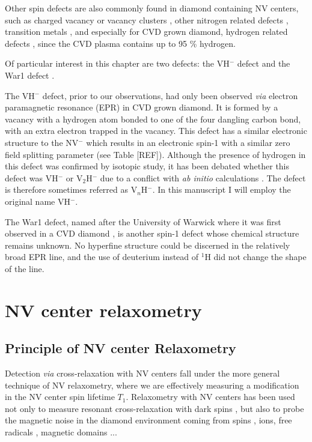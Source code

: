 \documentclass[a4paper]{report}
\begin{document}
Other spin defects are also commonly found in diamond containing NV centers, such as charged vacancy or vacancy clusters \citep{hounsome2006origin}, other nitrogen related defects \citep{newton2007epr}, transition metals \citep{isoya1990fourier}, and especially for CVD grown diamond, hydrogen related defects \citep{hartland2014study}, since the CVD plasma contains up to 95 \% hydrogen.

Of particular interest in this chapter are two defects: the VH$^-$ defect \citep{glover2003hydrogen, glover2004hydrogen} and the War1 defect \citep{cruddace2007magnetic}. 

The VH$^-$ defect, prior to our observations, had only been observed \textit{via} electron paramagnetic resonance (EPR) in CVD grown diamond. It is formed by a vacancy with a hydrogen atom bonded to one of the four dangling carbon bond, with an extra electron trapped in the vacancy. This defect has a similar electronic structure to the NV$^-$ which results in an electronic spin-1 with a similar zero field splitting parameter (see Table [REF]). Although the presence of hydrogen in this defect was confirmed by isotopic study, it has been debated whether this defect was VH$^-$ or V$_2$H$^-$ due to a conflict with \textit{ab initio} calculations \citep{shaw2005importance}. The defect is therefore sometimes referred as V$_n$H$^-$. In this manuscript I will employ the original name VH$^-$.

The War1 defect, named after the University of Warwick where it was first observed in a CVD diamond \citep{cruddace2007magnetic}, is another spin-1 defect whose chemical structure remains unknown. No hyperfine structure could be discerned in the relatively broad EPR line, and the use of deuterium instead of $^1$H did not change the shape of the line.

\section{NV center relaxometry}

\subsection{Principle of NV center Relaxometry}
Detection \textit{via} cross-relaxation	with NV centers fall under the more general technique of NV relaxometry, where we are effectively measuring a modification in the NV center spin lifetime $T_1$. Relaxometry with NV centers has been used not only to measure resonant cross-relaxation with dark spins \citep{van1989cross,holliday1989optical,armstrong2010nv, epstein2005anisotropic,  hall2016detection ,wickenbrock2016microwave,  wood2016wide,  alfasi2019detection, lazda2021cross}, but also to probe the magnetic noise in the diamond environment coming from spins \citep{steinert2013magnetic}, ions\citep{tetienne2013spin}, free radicals \citep{nie2021quantum}, magnetic domains \citep{finco2021imaging}...
\end{document}
